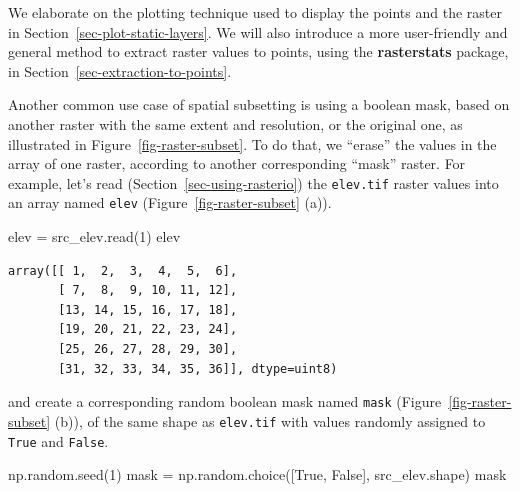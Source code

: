 \documentclass[
  letterpaper,
]{krantz}
\newenvironment{Shaded}{\begin{snugshade}}{\end{snugshade}}
\newcommand{\DecValTok}[1]{\textcolor[rgb]{0.68,0.00,0.00}{#1}}
\newcommand{\NormalTok}[1]{\textcolor[rgb]{0.00,0.23,0.31}{#1}}
\newcommand{\OperatorTok}[1]{\textcolor[rgb]{0.37,0.37,0.37}{#1}}
\newcommand{\VariableTok}[1]{\textcolor[rgb]{0.07,0.07,0.07}{#1}}
\begin{document}
\begin{tcolorbox}[enhanced jigsaw, title=\textcolor{quarto-callout-note-color}{\faInfo}\hspace{0.5em}{Note}, arc=.35mm, toprule=.15mm, titlerule=0mm, colframe=quarto-callout-note-color-frame, breakable, toptitle=1mm, bottomtitle=1mm, rightrule=.15mm, colbacktitle=quarto-callout-note-color!10!white, leftrule=.75mm, left=2mm, bottomrule=.15mm, opacityback=0, coltitle=black, opacitybacktitle=0.6, colback=white]

We elaborate on the plotting technique used to display the points and
the raster in Section~\ref{sec-plot-static-layers}. We will also
introduce a more user-friendly and general method to extract raster
values to points, using the \textbf{rasterstats} package, in
Section~\ref{sec-extraction-to-points}.

\end{tcolorbox}

Another common use case of spatial subsetting is using a boolean mask,
based on another raster with the same extent and resolution, or the
original one, as illustrated in Figure~\ref{fig-raster-subset}. To do
that, we ``erase'' the values in the array of one raster, according to
another corresponding ``mask'' raster. For example, let's read
(Section~\ref{sec-using-rasterio}) the \texttt{elev.tif} raster values
into an array named \texttt{elev} (Figure~\ref{fig-raster-subset} (a)).

\begin{Shaded}
\begin{Highlighting}[]
\NormalTok{elev }\OperatorTok{=}\NormalTok{ src\_elev.read(}\DecValTok{1}\NormalTok{)}
\NormalTok{elev}
\end{Highlighting}
\end{Shaded}

\begin{verbatim}
array([[ 1,  2,  3,  4,  5,  6],
       [ 7,  8,  9, 10, 11, 12],
       [13, 14, 15, 16, 17, 18],
       [19, 20, 21, 22, 23, 24],
       [25, 26, 27, 28, 29, 30],
       [31, 32, 33, 34, 35, 36]], dtype=uint8)
\end{verbatim}

and create a corresponding random boolean mask named \texttt{mask}
(Figure~\ref{fig-raster-subset} (b)), of the same shape as
\texttt{elev.tif} with values randomly assigned to \texttt{True} and
\texttt{False}.

\begin{Shaded}
\begin{Highlighting}[]
\NormalTok{np.random.seed(}\DecValTok{1}\NormalTok{)}
\NormalTok{mask }\OperatorTok{=}\NormalTok{ np.random.choice([}\VariableTok{True}\NormalTok{, }\VariableTok{False}\NormalTok{], src\_elev.shape)}
\NormalTok{mask}
\end{Highlighting}
\end{Shaded}
\end{document}
